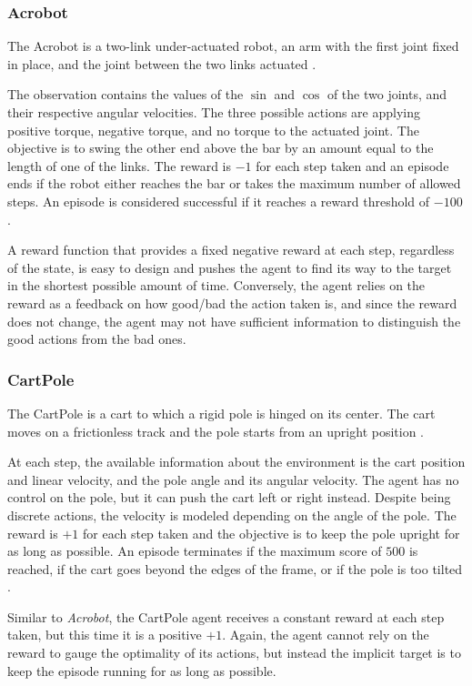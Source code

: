\subsubsection{Acrobot}
The Acrobot is a two-link under-actuated robot, an arm with the first joint fixed in place, and the joint between the two links actuated \cite{acrobot}.

The observation contains the values of the $\sin$ and $\cos$ of the two joints, and their respective angular velocities. The three possible actions are applying positive torque, negative torque, and no torque to the actuated joint. The objective is to swing the other end above the bar by an amount equal to the length of one of the links. The reward is $-1$ for each step taken and an episode ends if the robot either reaches the bar or takes the maximum number of allowed steps. An episode is considered successful if it reaches a reward threshold of $-100$ \cite{farama_gymnasium}.

A reward function that provides a fixed negative reward at each step, regardless of the state, is easy to design and pushes the agent to find its way to the target in the shortest possible amount of time. Conversely, the agent relies on the reward as a feedback on how good/bad the action taken is, and since the reward does not change, the agent may not have sufficient information to distinguish the good actions from the bad ones.

\subsubsection{CartPole}
The CartPole is a cart to which a rigid pole is hinged on its center. The cart moves on a frictionless track and the pole starts from an upright position \cite{cartpole}.

At each step, the available information about the environment is the cart position and linear velocity, and the pole angle and its angular velocity. The agent has no control on the pole, but it can push the cart left or right instead. Despite being discrete actions, the velocity is modeled depending on the angle of the pole. The reward is $+1$ for each step taken and the objective is to keep the pole upright for as long as possible. An episode terminates if the maximum score of $500$ is reached, if the cart goes beyond the edges of the frame, or if the pole is too tilted \cite{farama_gymnasium}.

Similar to \textit{Acrobot}, the CartPole agent receives a constant reward at each step taken, but this time it is a positive $+1$. Again, the agent cannot rely on the reward to gauge the optimality of its actions, but instead the implicit target is to keep the episode running for as long as possible.

